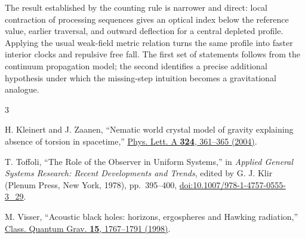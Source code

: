 \documentclass[aps,prd,reprint,nofootinbib]{revtex4-2}
\begin{document}
The result established by the counting rule is narrower and direct:
local contraction of processing sequences gives an optical index below
the reference value, earlier traversal, and outward deflection for a
central depleted profile. Applying the usual weak-field metric
relation turns the same profile into faster interior clocks and
repulsive free fall. The first set of statements follows from the
continuum propagation model; the second identifies a precise additional
hypothesis under which the missing-step intuition becomes a
gravitational analogue.

\begin{thebibliography}{3}

H. Kleinert and J. Zaanen,
``Nematic world crystal model of gravity explaining absence of torsion
in spacetime,''
\href{https://doi.org/10.1016/j.physleta.2004.03.048}
{Phys. Lett. A \textbf{324}, 361--365 (2004)}.

T. Toffoli, ``The Role of the Observer in Uniform Systems,''
in \emph{Applied General Systems Research: Recent Developments and
Trends}, edited by G. J. Klir (Plenum Press, New York, 1978),
pp.~395--400,
\href{https://doi.org/10.1007/978-1-4757-0555-3_29}
{doi:10.1007/978-1-4757-0555-3\_29}.

M. Visser, ``Acoustic black holes: horizons, ergospheres and Hawking
radiation,''
\href{https://doi.org/10.1088/0264-9381/15/6/024}
{Class. Quantum Grav. \textbf{15}, 1767--1791 (1998)}.

\end{thebibliography}
\end{document}
